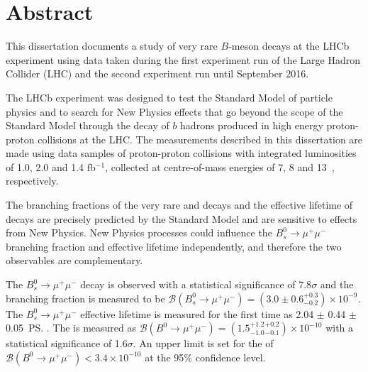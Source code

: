 \chapter{Abstract}

This dissertation documents a study of very rare $B$-meson decays at the LHCb experiment using data taken during the first experiment run of the Large Hadron Collider (LHC) and the second experiment run until September 2016.



The LHCb experiment was designed to test the Standard Model of particle physics and to search for New Physics effects that go beyond the scope of the Standard Model through the decay of $b$ hadrons produced in high energy proton-proton collisions at the LHC. The measurements described in this dissertation are made using data samples of proton-proton collisions with integrated luminosities of 1.0, 2.0 and 1.4 fb$^{-1}$, collected at centre-of-mass energies of 7, 8 and 13~\tev, respectively. %

The branching fractions of the very rare \bdmumu and \bsmumu decays and the effective lifetime of \bsmumu decays are precisely predicted by the Standard Model and are sensitive to effects from New Physics. 
New Physics processes could influence the $B_{s}^{0} \to \mu^{+} \mu^{-}$  branching fraction and effective lifetime independently, and therefore the two observables are complementary. %




The $B_{s}^{0} \to \mu^{+} \mu^{-}$ decay is observed with a statistical significance of 7.8$\sigma$ and the branching fraction is measured to be $\mathcal{B}(B_{s}^{0} \to \mu^{+} \mu^{-}) = (3.0 \pm 0.6^{ +0.3}_{ -0.2}) \times 10^{-9}$. The $B_{s}^{0} \to \mu^{+} \mu^{-}$ effective lifetime is measured for the first time as 2.04 $\pm$ 0.44 $\pm$ 0.05~\ps.
The \bdmumu \BF is measured as $\mathcal{B}(B^{0} \to \mu^{+} \mu^{-}) = (1.5^{+1.2}_{-1.0}^{+0.2}_{-0.1})\times 10^{-10}$ with a statistical significance of 1.6$\sigma$. An upper limit is set for the \BF of $\mathcal{B}(B^{0} \to \mu^{+} \mu^{-})< 3.4 \times 10^{-10}$ at the 95$\%$ confidence level. 

